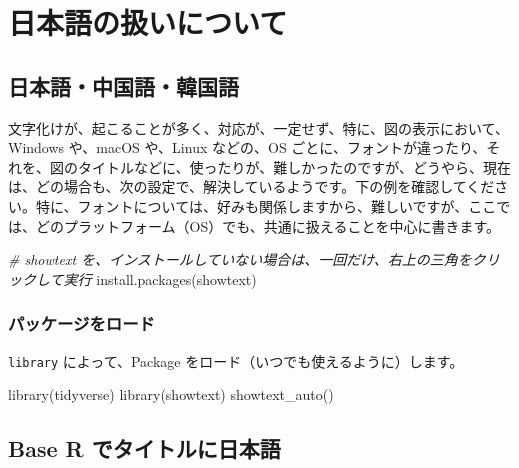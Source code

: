 \documentclass[
]{bxjsbook}
\newenvironment{Shaded}{\begin{snugshade}}{\end{snugshade}}
\newcommand{\CommentTok}[1]{\textcolor[rgb]{0.56,0.35,0.01}{\textit{#1}}}
\newcommand{\FunctionTok}[1]{\textcolor[rgb]{0.00,0.00,0.00}{#1}}
\newcommand{\NormalTok}[1]{#1}
\newcommand{\StringTok}[1]{\textcolor[rgb]{0.31,0.60,0.02}{#1}}
\theoremstyle{definition}
\theoremstyle{definition}
\theoremstyle{definition}
\theoremstyle{definition}
\theoremstyle{remark}
\begin{document}
\hypertarget{japanese}{%
\section{日本語の扱いについて}\label{japanese}}

\hypertarget{ux65e5ux672cux8a9eux4e2dux56fdux8a9eux97d3ux56fdux8a9e}{%
\subsection{日本語・中国語・韓国語}\label{ux65e5ux672cux8a9eux4e2dux56fdux8a9eux97d3ux56fdux8a9e}}

文字化けが、起こることが多く、対応が、一定せず、特に、図の表示において、Windows や、macOS や、Linux などの、OS ごとに、フォントが違ったり、それを、図のタイトルなどに、使ったりが、難しかったのですが、どうやら、現在は、どの場合も、次の設定で、解決しているようです。下の例を確認してください。特に、フォントについては、好みも関係しますから、難しいですが、ここでは、どのプラットフォーム（OS）でも、共通に扱えることを中心に書きます。

\begin{Shaded}
\begin{Highlighting}[]
\CommentTok{\# showtext を、インストールしていない場合は、一回だけ、右上の三角をクリックして実行}
\FunctionTok{install.packages}\NormalTok{(}\StringTok{\textquotesingle{}showtext\textquotesingle{}}\NormalTok{)}
\end{Highlighting}
\end{Shaded}

\hypertarget{ux30d1ux30c3ux30b1ux30fcux30b8ux3092ux30edux30fcux30c9}{%
\subsubsection{パッケージをロード}\label{ux30d1ux30c3ux30b1ux30fcux30b8ux3092ux30edux30fcux30c9}}

\texttt{library} によって、Package をロード（いつでも使えるように）します。

\begin{Shaded}
\begin{Highlighting}[]
\FunctionTok{library}\NormalTok{(tidyverse)}
\FunctionTok{library}\NormalTok{(showtext) }
\FunctionTok{showtext\_auto}\NormalTok{()}
\end{Highlighting}
\end{Shaded}

\hypertarget{base-r-ux3067ux30bfux30a4ux30c8ux30ebux306bux65e5ux672cux8a9e}{%
\subsection{Base R でタイトルに日本語}\label{base-r-ux3067ux30bfux30a4ux30c8ux30ebux306bux65e5ux672cux8a9e}}
\end{document}
